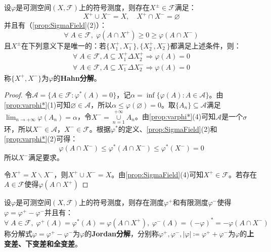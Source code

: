 \begin{theorem}\label{theo:HahnDecomposition}
	设$\varphi$是可测空间$(X,\mathscr{F})$上的符号测度，则存在$X^{\pm}\in\mathscr{F}$满足：
	\begin{equation*}
		X^+\cup X^-=X,\quad X^+\cap X^-=\varnothing
	\end{equation*}
	并且有（\cref{prop:SigmaField}(2)）：
	\begin{equation*}
		\forall\;A\in\mathscr{F},\;\varphi(A\cap X^+)\geqslant0\geqslant\varphi(A\cap X^-)
	\end{equation*}
	且$X^{\pm}$在下列意义下是唯一的：若$\{X^+_1,X^-_1\},\{X^+_2,X^-_2\}$都满足上述条件，则：
	\begin{gather*}
		\forall\;A\in\mathscr{F},A\subseteq X^+_1\Delta X^+_2\Rightarrow\varphi(A)=0 \\
		\forall\;A\in\mathscr{F},A\subseteq X^-_1\Delta X^-_2\Rightarrow\varphi(A)=0
	\end{gather*}
	称$\{X^+,X^-\}$为$\varphi$的\textbf{Hahn分解}。
\end{theorem}
\begin{proof}
	令$\mathscr{A}=\{A\in\mathscr{F}:\varphi^*(A)=0\}$，记$\alpha=\inf\{\varphi(A):A\in\mathscr{A}\}$。由\cref{prop:varphi*}(1)可知$\varnothing\in\mathscr{A}$，所以$\alpha\leqslant\varphi(\varnothing)=0$。取$\{A_n\}\subseteq\mathscr{A}$满足$\lim_{n\to+\infty}\limits\varphi(A_n)=\alpha$，令$X^-=\underset{n=1}{\overset{+\infty}{\cup}}A_n$。由\cref{prop:varphi*}(4)可知$\mathscr{A}$是一个$\sigma$环，所以$X^-\in\mathscr{A}$，$X^-\in\mathscr{F}$。根据$\varphi^*$的定义、\cref{prop:SigmaField}(2)和\cref{prop:varphi*}(2)可得：
	\begin{equation*}
		\varphi(A\cap X^-)\leqslant\varphi^*(A\cap X^-)\leqslant\varphi^*(X^-)=0
	\end{equation*}
	所以$X^-$满足要求。\par
	令$X^+=X\backslash X^-$，则$X^+\cup X^-=X$。由\cref{prop:SigmaField}(4)可知$X^+\in\mathscr{F}$。若存在$A\in\mathscr{F}$使得$\varphi(A\cap X^+)$
\end{proof}
\begin{theorem}
	设$\varphi$是可测空间$(X,\mathscr{F})$上的符号测度，则存在测度$\varphi^+$和有限测度$\varphi^-$使得$\varphi=\varphi^+-\varphi^-$并且有：
	\begin{equation*}
		\forall\;A\in\mathscr{F},\;\varphi^+(A)=\varphi^*(A)=\varphi(A\cap X^+),\;\varphi^-(A)=(-\varphi)^*=-\varphi(A\cap X^-)
	\end{equation*}
	称分解式$\varphi=\varphi^+-\varphi^-$为$\varphi$的\textbf{Jordan分解}，分别称$\varphi^+,\varphi^-,|\varphi|\coloneq\varphi^++\varphi^-$为$\varphi$的\textbf{上变差、下变差和全变差}。
\end{theorem}
